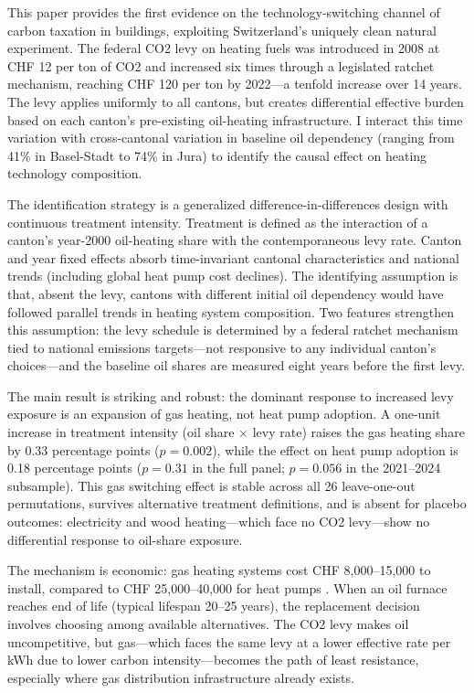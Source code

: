 \documentclass[12pt]{article}
\begin{document}
This paper provides the first evidence on the technology-switching channel of carbon taxation in buildings, exploiting Switzerland's uniquely clean natural experiment. The federal CO2 levy on heating fuels was introduced in 2008 at CHF 12 per ton of CO2 and increased six times through a legislated ratchet mechanism, reaching CHF 120 per ton by 2022---a tenfold increase over 14 years. The levy applies uniformly to all cantons, but creates differential effective burden based on each canton's pre-existing oil-heating infrastructure. I interact this time variation with cross-cantonal variation in baseline oil dependency (ranging from 41\% in Basel-Stadt to 74\% in Jura) to identify the causal effect on heating technology composition.

The identification strategy is a generalized difference-in-differences design with continuous treatment intensity. Treatment is defined as the interaction of a canton's year-2000 oil-heating share with the contemporaneous levy rate. Canton and year fixed effects absorb time-invariant cantonal characteristics and national trends (including global heat pump cost declines). The identifying assumption is that, absent the levy, cantons with different initial oil dependency would have followed parallel trends in heating system composition. Two features strengthen this assumption: the levy schedule is determined by a federal ratchet mechanism tied to national emissions targets---not responsive to any individual canton's choices---and the baseline oil shares are measured eight years before the first levy.

The main result is striking and robust: the dominant response to increased levy exposure is an expansion of gas heating, not heat pump adoption. A one-unit increase in treatment intensity (oil share $\times$ levy rate) raises the gas heating share by 0.33 percentage points ($p = 0.002$), while the effect on heat pump adoption is 0.18 percentage points ($p = 0.31$ in the full panel; $p = 0.056$ in the 2021--2024 subsample). This gas switching effect is stable across all 26 leave-one-out permutations, survives alternative treatment definitions, and is absent for placebo outcomes: electricity and wood heating---which face no CO2 levy---show no differential response to oil-share exposure.

The mechanism is economic: gas heating systems cost CHF 8,000--15,000 to install, compared to CHF 25,000--40,000 for heat pumps \citep{opm2014}. When an oil furnace reaches end of life (typical lifespan 20--25 years), the replacement decision involves choosing among available alternatives. The CO2 levy makes oil uncompetitive, but gas---which faces the same levy at a lower effective rate per kWh due to lower carbon intensity---becomes the path of least resistance, especially where gas distribution infrastructure already exists.
\end{document}
